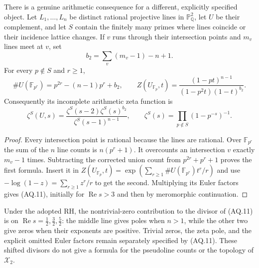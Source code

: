 \documentclass[11pt,a4paper]{article}
\theoremstyle{definition}\newtheorem{definition}[theorem]{Definition}
\theoremstyle{remark}\newtheorem{remark}[theorem]{Remark}
\begin{document}
There is a genuine arithmetic consequence for a
different, explicitly specified object.
Let $L_1,\dots,L_n$ be distinct rational projective
lines in $\mathbb P^2_{\mathbb Q}$, let $U$ be their
complement, and let $S$ contain the finitely many
primes where lines coincide or their incidence
lattice changes. If $v$ runs through their
intersection points and $m_v$ lines meet at $v$, set
\[
 b_2=\sum_v(m_v-1)-n+1.
\]
For every $p\notin S$ and $r\geq1$,
\[
 \#U(\mathbb F_{p^r})=p^{2r}-(n-1)p^r+b_2,\qquad
 Z(U_{\mathbb F_p},t)
  =\frac{(1-pt)^{n-1}}{(1-p^2t)(1-t)^{b_2}}.                  \tag{AQ.10}
\]
Consequently its incomplete arithmetic zeta function is
\[
 \zeta^S(U,s)=
 \frac{\zeta^S(s-2)\zeta^S(s)^{b_2}}
      {\zeta^S(s-1)^{n-1}},\qquad
 \zeta^S(s)=\prod_{p\notin S}(1-p^{-s})^{-1}.                 \tag{AQ.11}
\]
\begin{proof}
Every intersection point is rational because the
lines are rational. Over $\mathbb F_{p^r}$ the sum
of the $n$ line counts is $n(p^r+1)$.
It overcounts an intersection $v$ exactly $m_v-1$
times. Subtracting the corrected union count from
$p^{2r}+p^r+1$ proves the first formula.
Insert it in
$Z(U_{\mathbb F_p},t)=
\exp(\sum_{r\geq1}\#U(\mathbb F_{p^r})t^r/r)$
and use $-\log(1-z)=\sum_{r\geq1}z^r/r$ to get
the second. Multiplying its Euler factors gives
(AQ.11), initially for $\operatorname{Re}s>3$
and then by meromorphic continuation.
\end{proof}
Under the adopted RH, the nontrivial-zero contribution
to the divisor of (AQ.11) is on
$\operatorname{Re}s=\tfrac12,\tfrac32,\tfrac52$:
the middle line gives poles when $n>1$, while the
other two give zeros when their exponents are
positive. Trivial zeros, the zeta pole, and the
explicit omitted Euler factors remain separately
specified by (AQ.11). These shifted divisors do not
give a formula for the pseudoline counts or the
topology of $\mathcal X_2$.
\end{document}
